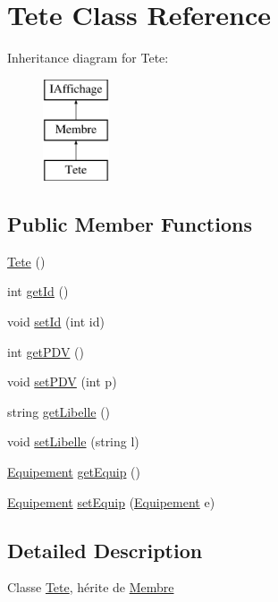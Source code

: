 \hypertarget{class_tete}{\section{\-Tete \-Class \-Reference}
\label{class_tete}
}
\-Inheritance diagram for \-Tete\-:\begin{figure}[H]
\begin{center}
\leavevmode
\includegraphics[height=3.000000cm]{class_tete}
\end{center}
\end{figure}
\subsection*{\-Public \-Member \-Functions}
\begin{DoxyCompactItemize}
\item 
\hyperlink{class_tete_a0e1d458209193725c9f615a9ca5b13f1}{\-Tete} ()
\item 
int \hyperlink{class_tete_a78683bd6baef917ed2db10f1a703b0ac}{get\-Id} ()
\item 
void \hyperlink{class_tete_adf73f2de90a86656810db42e96033858}{set\-Id} (int id)
\item 
int \hyperlink{class_tete_aa2c9934f7442d9a5e8cb2fc5c050e554}{get\-P\-D\-V} ()
\item 
void \hyperlink{class_tete_a07df0ae5bc33c6c6c216541046e3995a}{set\-P\-D\-V} (int p)
\item 
string \hyperlink{class_tete_afb6abc9aae3bd726acbe7f725d6ffa96}{get\-Libelle} ()
\item 
void \hyperlink{class_tete_a644eff8bb48835a4e82e848411e30ae8}{set\-Libelle} (string l)
\item 
\hyperlink{class_equipement}{\-Equipement} \hyperlink{class_tete_ae0e3b91eca717e2e5479f72feaef5b90}{get\-Equip} ()
\item 
\hyperlink{class_equipement}{\-Equipement} \hyperlink{class_tete_a126334fb3e157995becf73c2ba3ff10c}{set\-Equip} (\hyperlink{class_equipement}{\-Equipement} e)
\end{DoxyCompactItemize}


\subsection{\-Detailed \-Description}
\-Classe \hyperlink{class_tete}{\-Tete}, hérite de \hyperlink{class_membre}{\-Membre} 

